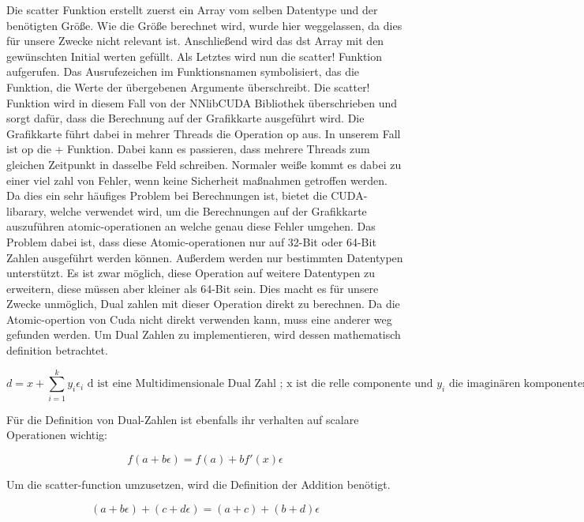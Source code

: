 Die scatter Funktion erstellt zuerst ein Array vom selben Datentype und der benötigten Größe. 
Wie die Größe berechnet wird, wurde hier weggelassen, da dies für unsere Zwecke nicht relevant ist. 
Anschließend wird das dst Array mit den gewünschten Initial werten gefüllt.
Als Letztes wird nun die scatter! Funktion aufgerufen.
Das Ausrufezeichen im Funktionsnamen symbolisiert, das die Funktion, die Werte der übergebenen Argumente überschreibt.
Die scatter! Funktion wird in diesem Fall von der NNlibCUDA Bibliothek überschrieben und sorgt dafür, 
dass die Berechnung auf der Grafikkarte ausgeführt wird.
Die Grafikkarte führt dabei in mehrer Threads die Operation op aus. In unserem Fall ist op die + Funktion.
Dabei kann es passieren, dass mehrere Threads zum gleichen Zeitpunkt in dasselbe Feld schreiben.
Normaler weiße kommt es dabei zu einer viel zahl von Fehler, wenn keine Sicherheit maßnahmen getroffen werden. 
Da dies ein sehr häufiges Problem bei Berechnungen ist, bietet die CUDA-libarary, 
welche verwendet wird, um die Berechnungen auf der Grafikkarte auszuführen atomic-operationen an
welche genau diese Fehler umgehen.
Das Problem dabei ist, dass diese Atomic-operationen nur auf 32-Bit oder 64-Bit Zahlen ausgeführt werden können.
Außerdem werden nur bestimmten Datentypen unterstützt.
Es ist zwar möglich, diese Operation auf weitere Datentypen zu erweitern, diese müssen aber kleiner als 64-Bit sein. 
Dies macht es für unsere Zwecke unmöglich, Dual zahlen mit dieser Operation direkt zu berechnen.
Da die Atomic-opertion von Cuda nicht direkt verwenden kann, muss eine anderer weg gefunden werden.
Um Dual Zahlen zu implementieren, wird dessen mathematisch definition betrachtet.


$$
 d = x + \sum_{i = 1}^{k} y_i \epsilon_i \text{ d ist eine Multidimensionale Dual Zahl ; x ist
die relle componente und $y_i$ die imaginären komponenten}
$$

Für die Definition von Dual-Zahlen ist ebenfalls ihr verhalten auf scalare Operationen wichtig:

$$
 f( a + b \epsilon ) = f(a) + b f'(x) \epsilon
$$

Um die scatter-function umzusetzen, wird die Definition der Addition benötigt.

$$
(a + b \epsilon) + ( c + d \epsilon ) = (a + c) + (b + d) \epsilon
$$


